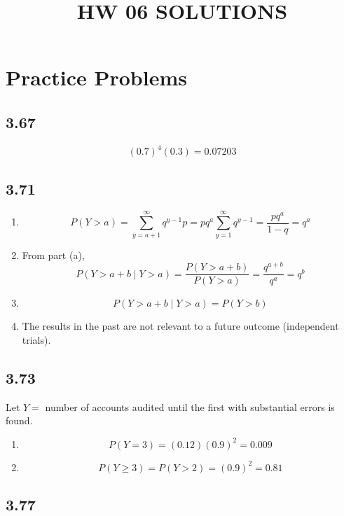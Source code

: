 \documentclass[
  letterpaper,
  DIV=11,
  numbers=noendperiod]{scrartcl}
\title{HW 06 SOLUTIONS}
\author{}
\date{}
\begin{document}
\maketitle


\section{Practice Problems}\label{practice-problems}

\subsection{3.67}\label{section}

\[(0.7)^4 (0.3) = 0.07203\]

\subsection{3.71}\label{section-1}

\begin{enumerate}
\def\labelenumi{(\alph{enumi})}
\item
  \[P(Y > a) = \sum_{y = a + 1}^{\infty} q^{y-1}p = pq^a\sum_{y = 1}^{\infty} q^{y-1} = \frac{pq^a}{1 - q} = q^a\]
\item
  From part (a),
  \[P(Y > a+b \mid Y > a) = \frac{P(Y > a+b)}{P(Y > a)} = \frac{q^{a+b}}{q^a} = q^b\]
\item
  \[P(Y > a+b \mid Y > a) = P(Y > b)\]
\item
  The results in the past are not relevant to a future outcome
  (independent trials).
\end{enumerate}

\subsection{3.73}\label{section-2}

Let \(Y =\) number of accounts audited until the first with substantial
errors is found.

\begin{enumerate}
\def\labelenumi{(\alph{enumi})}
\item
  \[P(Y = 3) = (0.12)(0.9)^2 = 0.009\]
\item
  \[P(Y \geq 3) = P(Y > 2) = (0.9)^2 = 0.81\]
\end{enumerate}

\subsection{3.77}\label{section-3}
\end{document}
